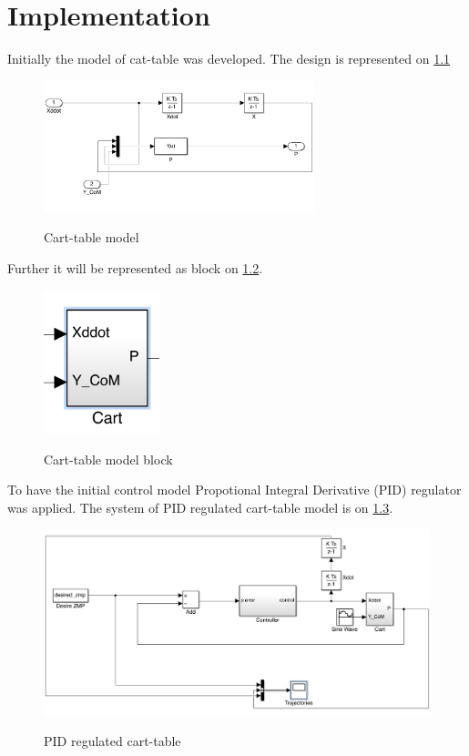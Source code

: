\documentclass[12pt,a4paper]{report}
\begin{document}
	\chapter{Implementation}
		Initially the model of cat-table was developed. The design is represented on \cref{fig:13}
		\begin{figure}[h!]
			\vspace{-0.2cm}
			\centering
			{\includegraphics[width=0.7\textwidth]{13}}
			\caption{Cart-table model}
			\label{fig:13}
			\vspace{-0.1cm}
		\end{figure}
		
		Further it will be represented as block on \cref{fig:14}.
		
		\begin{figure}[h!]
			\vspace{-0.2cm}
			\centering
			{\includegraphics[width=0.3\textwidth]{14}}
			\caption{Cart-table model block}
			\label{fig:14}
			\vspace{-0.1cm}
		\end{figure}
		
		To have the initial control model Propotional Integral Derivative (PID) regulator was applied. The system of PID regulated cart-table model is on \cref{fig:15}.
		
		\begin{figure}[h!]
			\vspace{-0.2cm}
			\centering
			{\includegraphics[width=1\textwidth]{15}}
			\caption{PID regulated cart-table}
			\label{fig:15}
			\vspace{-0.1cm}
		\end{figure}
		
\end{document}
